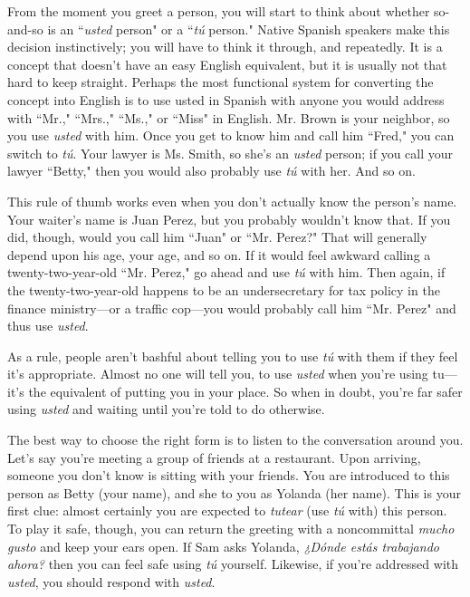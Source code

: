 From the moment you greet a person, you will start to think
about whether so-and-so is an ``\emph{usted} person" or a ``\emph{tú} person." Native
Spanish speakers make this decision instinctively; you will have to
think it through, and repeatedly. It is a concept that doesn't have an
easy English equivalent, but it is usually not that hard to keep straight.
Perhaps the most functional system for converting the concept into
English is to use usted in Spanish with anyone you would address with
``Mr.," ``Mrs.," ``Ms.," or ``Miss" in English. Mr. Brown is your neighbor, so you use \emph{usted} with him. Once you get to know him and call
him ``Fred," you can switch to \emph{tú}. Your lawyer is Ms. Smith, so she's
an \emph{usted} person; if you call your lawyer ``Betty," then you would also
probably use \emph{tú} with her. And so on.

This rule of thumb works even when you don't actually know
the person's name. Your waiter's name is Juan Perez, but you probably
wouldn't know that. If you did, though, would you call him ``Juan" or
``Mr. Perez?" That will generally depend upon his age, your age, and so
on. If it would feel awkward calling a twenty-two-year-old ``Mr. Perez,"
go ahead and use \emph{tú} with him. Then again, if the twenty-two-year-old
happens to be an undersecretary for tax policy in the finance ministry---or a traffic cop---you would probably call him ``Mr. Perez" and
thus use \emph{usted}.

As a rule, people aren't bashful about telling you to use \emph{tú}
with them if they feel it's appropriate. Almost no one will tell you, to
use \emph{usted} when you're using tu---it's the equivalent of putting you in
your place. So when in doubt, you're far safer using \emph{usted} and waiting
until you're told to do otherwise.

The best way to choose the right form is to listen to the conversation around you. Let's say you're meeting a group of friends at a
restaurant. Upon arriving, someone you don't know is sitting with
your friends. You are introduced to this person as Betty (your name),
and she to you as Yolanda (her name). This is your first clue: almost
certainly you are expected to \emph{tutear} (use \emph{tú} with) this person. To play
it safe, though, you can return the greeting with a noncommittal \emph{mucho gusto} and keep your ears open. If Sam asks Yolanda, \emph{¿Dónde estás
	trabajando ahora?} then you can feel safe using \emph{tú} yourself. Likewise, if
you're addressed with \emph{usted}, you should respond with \emph{usted}.

